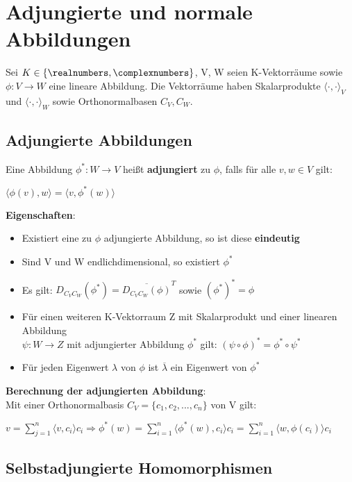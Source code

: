\section{Adjungierte und normale Abbildungen}%
\label{aa:sec:adjungierte_und_normale_abbildungen}

Sei $K \in \{\realnumbers, \complexnumbers\}$, V, W seien K-Vektorräume sowie $\phi: V \rightarrow W$ eine lineare Abbildung. Die Vektorräume haben Skalarprodukte $\langle \cdot, \cdot\rangle_V$ und $\langle \cdot, \cdot\rangle_W$ sowie Orthonormalbasen $C_V, C_W$.

\subsection{Adjungierte Abbildungen}%
\label{aa:sub:adjungierte_abbildungen}

Eine Abbildung $\phi^*: W \rightarrow V$ heißt \textbf{adjungiert} zu $\phi$, falls für alle $v, w \in V$ gilt:
\begin{center}
	$\langle \phi(v), w\rangle = \langle v, \phi^*(w)\rangle$
\end{center}
\textbf{Eigenschaften}:
\begin{itemize}
	\item Existiert eine zu $\phi$ adjungierte Abbildung, so ist diese \textbf{eindeutig}
	\item Sind V und W endlichdimensional, so existiert $\phi^*$
	\item Es gilt: $D_{C_VC_W}(\phi^*) = \overline{D_{C_VC_W}(\phi)}^T$ sowie $(\phi^*)^* = \phi$
	\item Für einen weiteren K-Vektorraum Z mit Skalarprodukt und einer linearen Abbildung\\ $\psi: W \rightarrow Z$ mit adjungierter Abbildung $\phi^*$ gilt: $(\psi \circ \phi)^* = \phi^* \circ \psi^*$
	\item Für jeden Eigenwert $\lambda$ von $\phi$ ist $\overline{\lambda}$ ein Eigenwert von $\phi^*$
\end{itemize}
\textbf{Berechnung der adjungierten Abbildung}:\\
Mit einer Orthonormalbasis $C_V = \{c_1, c_2, ..., c_n\}$ von V gilt:
\begin{center}
	$v = \sum_{j = 1}^{n}\langle v, c_i\rangle c_i \Rightarrow \phi^*(w) = \sum_{i = 1}^{n}\langle \phi^*(w), c_i\rangle c_i = \sum_{i = 1}^{n}\langle w, \phi(c_i)\rangle c_i$
\end{center}

\subsection{Selbstadjungierte Homomorphismen}%
\label{aa:sub:selbstadjungierte_homomorphismen}

